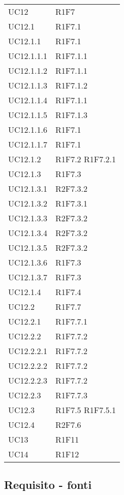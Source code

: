 {\begin{longtable}{C{4cm} C{11.5cm}}
UC12 & R1F7 \\
UC12.1 & R1F7.1 \\
UC12.1.1 & R1F7.1 \\
UC12.1.1.1 & R1F7.1.1 \\
UC12.1.1.2 & R1F7.1.1 \\
UC12.1.1.3 & R1F7.1.2 \\
UC12.1.1.4 & R1F7.1.1 \\
UC12.1.1.5 & R1F7.1.3 \\
UC12.1.1.6 & R1F7.1 \\
UC12.1.1.7 & R1F7.1 \\
UC12.1.2 & R1F7.2 \quad R1F7.2.1 \\
UC12.1.3 & R1F7.3 \\
UC12.1.3.1 & R2F7.3.2 \\
UC12.1.3.2 & R1F7.3.1 \\
UC12.1.3.3 & R2F7.3.2 \\
UC12.1.3.4 & R2F7.3.2 \\
UC12.1.3.5 & R2F7.3.2 \\
UC12.1.3.6 & R1F7.3 \\
UC12.1.3.7 & R1F7.3 \\
UC12.1.4 & R1F7.4 \\
UC12.2 & R1F7.7 \\
UC12.2.1 & R1F7.7.1 \\
UC12.2.2 & R1F7.7.2 \\
UC12.2.2.1 & R1F7.7.2 \\
UC12.2.2.2 & R1F7.7.2 \\
UC12.2.2.3 & R1F7.7.2 \\
UC12.2.3 & R1F7.7.3 \\
UC12.3 & R1F7.5 \quad R1F7.5.1\\
UC12.4 & R2F7.6 \\


UC13 & R1F11 \\
UC14 & R1F12 \\



\end{longtable}

}

\subsection{Requisito - fonti}


